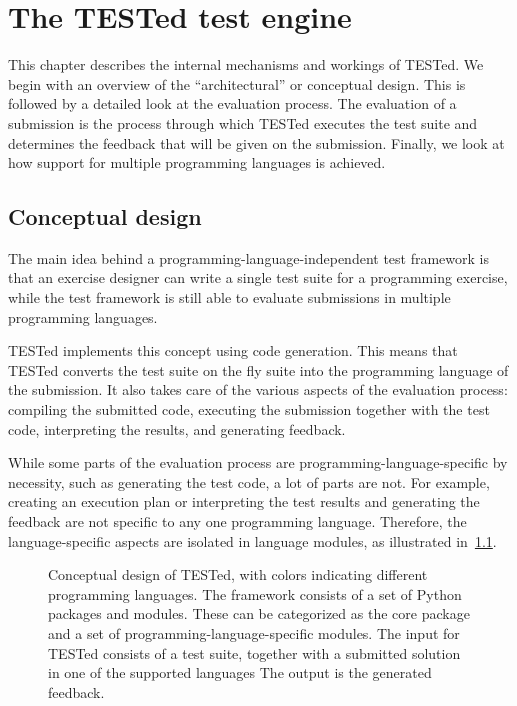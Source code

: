 \documentclass[../main]{subfiles}
\begin{document}
\chapter{The TESTed test engine}
\label{ch:tested-deel-1-tijdelijke-titel}

This chapter describes the internal mechanisms and workings of TESTed.
We begin with an overview of the ``architectural'' or conceptual design.
This is followed by a detailed look at the evaluation process.
The evaluation of a submission is the process through which TESTed executes the test suite and determines the feedback that will be given on the submission.
Finally, we look at how support for multiple programming languages is achieved.

\section{Conceptual design}
\label{sec:conceptual design}

The main idea behind a programming-language-independent test framework is that an exercise designer can write a single test suite for a programming exercise, while the test framework is still able to evaluate submissions in multiple programming languages.

TESTed implements this concept using code generation.
This means that TESTed converts the test suite on the fly suite into the programming language of the submission.
It also takes care of the various aspects of the evaluation process: compiling the submitted code, executing the submission together with the test code, interpreting the results, and generating feedback.

While some parts of the evaluation process are programming-language-specific by necessity, such as generating the test code, a lot of parts are not.
For example, creating an execution plan or interpreting the test results and generating the feedback are not specific to any one programming language.
Therefore, the language-specific aspects are isolated in language modules, as illustrated in~\cref{fig:conceptual-design}.

\begin{figure}[t]
    \centering
    
    \caption{
        Conceptual design of TESTed, with colors indicating different programming languages.
        The framework consists of a set of Python packages and modules.
        These can be categorized as the core package and a set of programming-language-specific modules.
        The input for TESTed consists of a test suite, together with a submitted solution in one of the supported languages
        The output is the generated feedback.
    }
    \label{fig:conceptual-design}
\end{figure}
\end{document}
